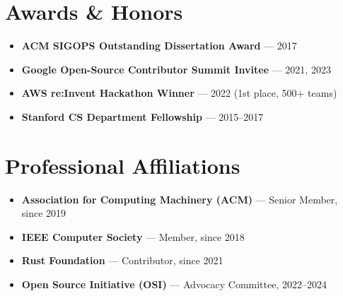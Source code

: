 \documentclass[
    language=english,
    doctype=cv,
    institution=none,
    titlestyle=simple
]{../../omnilatex}
\begin{document}
\section{\texorpdfstring{\color{cvsection}}{} \hspace{4pt}Awards \& Honors}

\begin{itemize}
    \item \textbf{ACM SIGOPS Outstanding Dissertation Award} --- 2017
    \item \textbf{Google Open-Source Contributor Summit Invitee} --- 2021, 2023
    \item \textbf{AWS re:Invent Hackathon Winner} --- 2022 (1st place, 500+ teams)
    \item \textbf{Stanford CS Department Fellowship} --- 2015--2017
\end{itemize}

\section{\texorpdfstring{\color{cvsection}}{} \hspace{4pt}Professional Affiliations}

\begin{itemize}
    \item \textbf{Association for Computing Machinery (ACM)} --- Senior Member, since 2019
    \item \textbf{IEEE Computer Society} --- Member, since 2018
    \item \textbf{Rust Foundation} --- Contributor, since 2021
    \item \textbf{Open Source Initiative (OSI)} --- Advocacy Committee, 2022--2024
\end{itemize}
\end{document}
